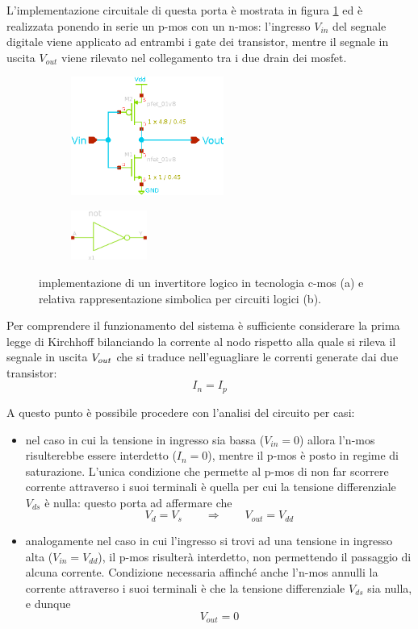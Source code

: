 	L'implementazione circuitale di questa porta è mostrata in figura \ref{fig:not:schematico} ed è realizzata ponendo in serie un p-mos con un n-mos: l'ingresso $V_{in}$ del segnale digitale viene applicato ad entrambi i gate dei transistor, mentre il segnale in uscita $V_{out}$ viene rilevato nel collegamento tra i due drain dei mosfet.
	
	\begin{figure}[bht]
		\centering
		\begin{subfigure}{0.48\linewidth}
			\centering
			\includegraphics[width=5cm]{Immagini/not-gate.eps} \caption{}			
		\end{subfigure}
		\begin{subfigure}{0.48\linewidth}
			\centering
			\includegraphics[width=2.5cm]{Immagini/not-gate-simple.eps} \caption{}			
		\end{subfigure}
		\caption{implementazione di un invertitore logico in tecnologia c-mos (a) e relativa rappresentazione simbolica per circuiti logici (b).} 
		\label{fig:not:schematico}
	\end{figure}
	
	Per comprendere il funzionamento del sistema è sufficiente considerare la prima legge di Kirchhoff bilanciando la corrente al nodo rispetto alla quale si rileva il segnale in uscita $V_{out}$ che si traduce nell'eguagliare le correnti generate dai due transistor:
	\[ I_n = I_p \]
	
	A questo punto è possibile procedere con l'analisi del circuito per casi:
	\begin{itemize}
		\item nel caso in cui la tensione in ingresso sia bassa ($V_{in} = 0$) allora l'n-mos risulterebbe essere interdetto ($I_n = 0$), mentre il p-mos è posto in regime di saturazione. L'unica condizione che permette al p-mos di non far scorrere corrente attraverso i suoi terminali è quella per cui la tensione differenziale $V_{ds}$ è nulla: questo porta ad affermare che
		\[ V_d = V_s \qquad \Rightarrow \qquad V_{out} = V_{dd} \]
		
		\item analogamente nel caso in cui l'ingresso si trovi ad una tensione in ingresso alta ($V_{in} = V_{dd}$), il p-mos risulterà interdetto, non permettendo il passaggio di alcuna corrente. Condizione necessaria affinché anche l'n-mos annulli la corrente attraverso i suoi terminali è che la tensione differenziale $V_{ds}$ sia nulla, e dunque
		\[ V_{out} = 0 \]
	\end{itemize} 
	
